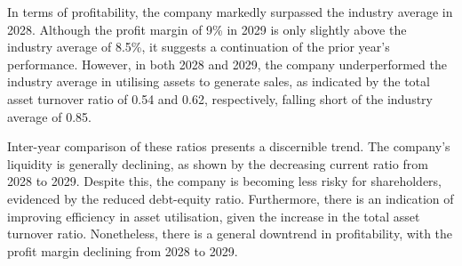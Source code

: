 In terms of profitability, the company markedly surpassed the industry average in 2028. Although the profit margin of 9\% in 2029 is only slightly above the industry average of 8.5\%, it suggests a continuation of the prior year's performance. However, in both 2028 and 2029, the company underperformed the industry average in utilising assets to generate sales, as indicated by the total asset turnover ratio of 0.54 and 0.62, respectively, falling short of the industry average of 0.85.

Inter-year comparison of these ratios presents a discernible trend. The company's liquidity is generally declining, as shown by the decreasing current ratio from 2028 to 2029. Despite this, the company is becoming less risky for shareholders, evidenced by the reduced debt-equity ratio. Furthermore, there is an indication of improving efficiency in asset utilisation, given the increase in the total asset turnover ratio. Nonetheless, there is a general downtrend in profitability, with the profit margin declining from 2028 to 2029.
